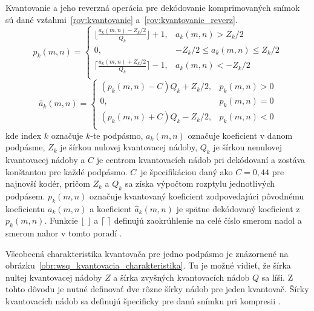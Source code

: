   Kvantovanie a jeho reverzná operácia pre dekódovanie komprimovaných snímok sú dané vzťahmi~{\ref{rov:kvantovanie}} a~{\ref{rov:kvantovanie_reverz}}.
  \begin{equation}
    p_k(m,n) =
    \begin{cases}
      \lfloor \frac{a_k(m,n) - Z_k / 2 }{Q_k} \rfloor + 1, & a_k(m,n) > Z_k/2 \\
      0, & -Z_k/2 \leq a_k(m,n) \leq Z_k/2 \\
      \lceil \frac{a_k(m,n) + Z_k / 2 }{Q_k} \rceil - 1, & a_k(m,n) < -Z_k/2 \\
    \end{cases}
    \label{rov:kvantovanie}
  \end{equation}
  \begin{equation}
    \hat{a}_k(m,n) = 
    \begin{cases}
      (p_k(m,n) - C)Q_k + Z_k/2, & p_k(m,n) > 0 \\
      0, & p_k(m,n) = 0 \\
      (p_k(m,n) + C)Q_k - Z_k/2, & p_k(m,n) < 0\\
    \end{cases}
    \label{rov:kvantovanie_reverz}
  \end{equation}
  kde index $k$ označuje $k$-te podpásmo, $a_k(m,n)$ označuje koeficient v danom podpásme, $Z_k$ je šírkou nulovej kvantovacej nádoby,
  $Q_k$ je šírkou nenulovej kvantovacej nádoby a $C$ je centrom kvantovacích nádob pri dekódovaní a zostáva konštantou pre každé podpásmo. {$C$}~je špecifikáciou
  daný ako $C = 0,44$ pre najnovší kodér, pričom $Z_k$ a $Q_k$ sa získa výpočtom rozptylu jednotlivých podpásem. $p_k(m,n)$ označuje kvantovaný koeficient
  zodpovedajúci pôvodnému koeficientu $a_k(m,n)$ a koeficient $\hat{a}_k(m,n)$ je spätne dekódovaný koeficient z~{$p_k(m,n)$}. Funkcie $\lfloor$ $\rfloor$
  a $\lceil$ $\rceil$ definujú zaokrúhlenie na celé číslo smerom nadol a smerom nahor v tomto poradí \cite{WSQSpecification}.

  Všeobecná charakteristika kvantovača pre jedno podpásmo je znázornené na obrázku~{\ref{obr:wsq_kvantovacia_charakteristika}}. Tu je možné vidieť, že šírka
  nultej kvantovacej nádoby $Z$ a šírka zvyšných kvantovacích nádob $Q$ sa líši. Z tohto dôvodu je nutné definovať dve rôzne šírky nádob pre jeden kvantovač.
  Šírky kvantovacích nádob sa definujú špecificky pre danú snímku pri kompresii \cite{brislawn1996compression}.

